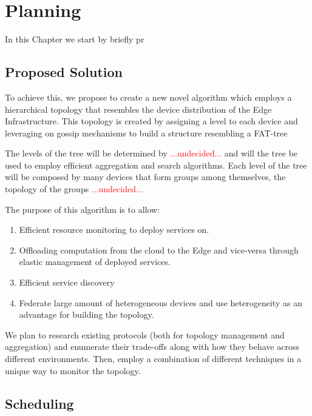 \chapter{Planning}
\label{cha:planning}

In this Chapter we start by briefly pr

\section{Proposed Solution}
\label{cha:proposed_sol}

To achieve this, we propose to create a new novel algorithm which employs a hierarchical topology that resembles the device distribution of the Edge Infrastructure. This topology is created by assigning a level to each device and leveraging on gossip mechanisms to build a structure resembling a FAT-tree 

The levels of the tree will be determined by \textcolor{red}{...undecided...} and will the tree be used to employ efficient aggregation and search algorithms. Each level of the tree will be composed by many devices that form groups among themselves, the topology of the groups \textcolor{red}{...undecided...} 

The purpose of this algorithm is to allow:

\begin{enumerate} 
    \item Efficient resource monitoring to deploy services on.
    \item Offloading computation from the cloud to the Edge and vice-versa through elastic management of deployed services.
    \item Efficient service discovery
    \item Federate large amount of heterogeneous devices and use heterogeneity as an advantage for building the topology.
\end{enumerate}

We plan to research existing protocols (both for topology management and aggregation) and enumerate their trade-offs along with how they behave across different environments. Then, employ a combination of different techniques in a unique way to monitor the topology.


\section{Scheduling}
